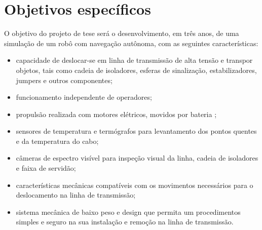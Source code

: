 \section{Objetivos específicos}
O objetivo do projeto de tese será o desenvolvimento, em três anos, de uma simulação de um robô com navegação autônoma, com as seguintes características:
\begin{itemize}
\item capacidade de deslocar-se em linha de transmissão de alta tensão e transpor objetos, tais como cadeia de isoladores, esferas de sinalização, estabilizadores, jumpers e outros componentes;
\item funcionamento independente de operadores;
\item propulsão realizada com motores elétricos, movidos por bateria	;
\item sensores de temperatura e termógrafos para levantamento dos pontos quentes e da temperatura do cabo;
\item câmeras de espectro visível para inspeção visual da linha, cadeia de isoladores e faixa de servidão;
\item características mecânicas compatíveis com os movimentos necessários para o deslocamento na linha de transmissão;
\item sistema mecânica de baixo peso e design que permita um procedimentos simples e seguro na sua instalação e remoção na linha de transmissão.
\end{itemize}

